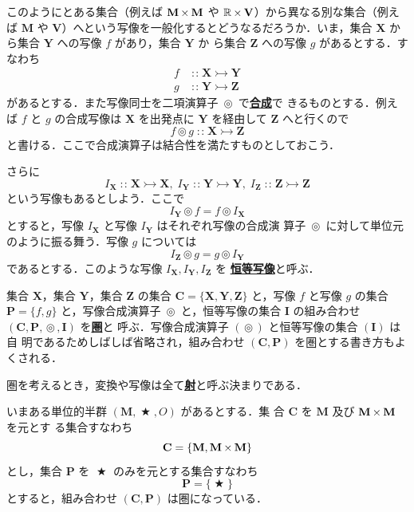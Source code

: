 \documentclass[a5paper,twoside,fleqn,draft]{jsbook}
\newcommand{\keyword}[1]{{\underline{\textbf{#1}}}}
\DeclareMathOperator{\mBinOp}{\bigstar}
\DeclareMathOperator{\mCompProj}{\circledcirc}
\DeclareMathOperator{\mIn}{{:\!:}}
\DeclareMathOperator{\mMorphTo}{\rightarrowtail}
\DeclareMathOperator{\mSetTimes}{\boldmath{\times}}
\newcommand{\mSet}[1]{\mathbf{#1}}
\newcommand{\mSpecialSet}[1]{\mathbb{#1}} %
\newcommand{\mRSet}{\mSpecialSet{R}}
\newcommand{\mTupleWith}[1]{\left(#1\right)}
\newcommand{\mMorph}[2]{#1\mMorphTo#2}
\begin{document}
このようにとある集合（例えば $\mSet{M}\mSetTimes\mSet{M}$ や
$\mRSet\mSetTimes\mSet{V}$）から異なる別な集合（例えば $\mSet{M}$ や
$\mSet{V}$）へという写像を一般化するとどうなるだろうか．いま，集合
$\mSet{X}$ から集合 $\mSet{Y}$ への写像 $f$ があり，集合 $\mSet{Y}$ か
ら集合 $\mSet{Z}$ への写像 $g$ があるとする．すなわち
\begin{align}
f&\mIn\mMorph{\mSet{X}}{\mSet{Y}}\\
g&\mIn\mMorph{\mSet{Y}}{\mSet{Z}}
\end{align}
があるとする．また写像同士を二項演算子 $\mCompProj$ で\keyword{合成}で
きるものとする．例えば $f$ と $g$ の合成写像は $\mSet{X}$ を出発点に
$\mSet{Y}$ を経由して $\mSet{Z}$ へと行くので
\begin{equation}
f\mCompProj g\mIn\mMorph{\mSet{X}}{\mSet{Z}}
\end{equation}
と書ける．ここで合成演算子は結合性を満たすものとしておこう．

さらに
\begin{equation}
I_\mSet{X}\mIn\mMorph{\mSet{X}}{\mSet{X}},\;
I_\mSet{Y}\mIn\mMorph{\mSet{Y}}{\mSet{Y}},\;
I_\mSet{Z}\mIn\mMorph{\mSet{Z}}{\mSet{Z}}
\end{equation}
という写像もあるとしよう．ここで
\begin{equation}
I_\mSet{Y}\mCompProj f=f\mCompProj I_\mSet{X}
\end{equation}
とすると，写像 $I_\mSet{X}$ と写像 $I_\mSet{Y}$ はそれぞれ写像の合成演
算子 $\mCompProj$ に対して単位元のように振る舞う．写像 $g$ については
\begin{equation}
I_\mSet{Z}\mCompProj g=g\mCompProj I_\mSet{Y}
\end{equation}
であるとする．このような写像 $I_\mSet{X},I_\mSet{Y},I_\mSet{Z}$ を
\keyword{恒等写像}と呼ぶ．

集合 $\mSet{X}$，集合 $\mSet{Y}$，集合 $\mSet{Z}$ の集合
$\mSet{C}=\{\mSet{X},\mSet{Y},\mSet{Z}\}$ と，写像 $f$ と写像
$g$ の集合 $\mSet{P}=\{f,g\}$ と，写像合成演算子 $\mCompProj$
と，恒等写像の集合 $\mSet{I}$ の組み合わせ
$\mTupleWith{\mSet{C},\mSet{P},\mCompProj,\mSet{I}}$ を\keyword{圏}と
呼ぶ．写像合成演算子 $(\mCompProj)$ と恒等写像の集合 $(\mSet{I})$ は自
明であるためしばしば省略され，組み合わせ
$\mTupleWith{\mSet{C},\mSet{P}}$ を圏とする書き方もよくされる．

圏を考えるとき，変換や写像は全て\keyword{射}と呼ぶ決まりである．

いまある単位的半群 $\mTupleWith{\mSet{M},\mBinOp,O}$ があるとする．集
合 $\mSet{C}$ を $\mSet{M}$ 及び $\mSet{M}\mSetTimes\mSet{M}$ を元とす
る集合すなわち
\begin{equation}
\mSet{C}=\{\mSet{M},\mSet{M}\mSetTimes\mSet{M}\}
\end{equation}
とし，集合 $\mSet{P}$ を $\mBinOp$ のみを元とする集合すなわち
\begin{equation}
\mSet{P}=\{\mBinOp\}
\end{equation}
とすると，組み合わせ $\mTupleWith{\mSet{C},\mSet{P}}$ は圏になっている．
\end{document}
